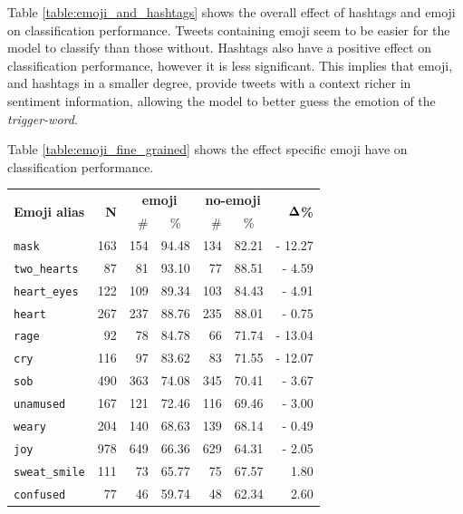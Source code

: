 \documentclass[11pt,a4paper]{article}
\begin{document}
Table \ref{table:emoji_and_hashtags} shows the overall effect of hashtags and
emoji on classification performance. Tweets containing emoji seem to be easier
for the model to classify than those without. Hashtags also have a positive
effect on classification performance, however it is less significant. This implies that emoji, and hashtags in a smaller degree, provide
tweets with a context richer in sentiment information, allowing the model to
better guess the emotion of the \textit{trigger-word}.

Table \ref{table:emoji_fine_grained} shows the effect specific emoji have on classification performance. 

\begin{table}[!h]
    \centering
    \scriptsize
        \begin{tabular}{lr|rc|rc|r}

           \multirow{2}{*}{\textbf{Emoji alias}} & \multirow{2}{*}{\textbf{N}} & \multicolumn{2}{c|}{\textbf{emoji}} & \multicolumn{2}{c|}{\textbf{no-emoji}} &
            \multirow{2}{*}{$\bf{\Delta}$\textbf{\%}} \\
            \cline{3-6}
                                &     & \#   & \% & \# & \% & \\
          \hline
          \hline
          \texttt{mask}         & 163 & 154 & 94.48 & 134 & 82.21 & - 12.27 \\
          \texttt{two\_hearts}  & 87  & 81  & 93.10 & 77  & 88.51 & - 4.59  \\
          \texttt{heart\_eyes}  & 122 & 109 & 89.34 & 103 & 84.43 & - 4.91  \\
          \texttt{heart}        & 267 & 237 & 88.76 & 235 & 88.01 & - 0.75  \\
          \texttt{rage}         & 92  & 78  & 84.78 & 66  & 71.74 & - 13.04 \\
          \texttt{cry}          & 116 & 97  & 83.62 & 83  & 71.55 & - 12.07 \\
          \texttt{sob}          & 490 & 363 & 74.08 & 345 & 70.41 & - 3.67  \\
          \texttt{unamused}     & 167 & 121 & 72.46 & 116 & 69.46 & - 3.00  \\
          \texttt{weary}        & 204 & 140 & 68.63 & 139 & 68.14 & - 0.49  \\
          \texttt{joy}          & 978 & 649 & 66.36 & 629 & 64.31 & - 2.05  \\
          \texttt{sweat\_smile} & 111 & 73  & 65.77 & 75  & 67.57 & 1.80 \\
          \texttt{confused}     & 77  & 46  & 59.74 & 48  & 62.34 & 2.60 \\


\end{tabular}
\end{table}
\end{document}
